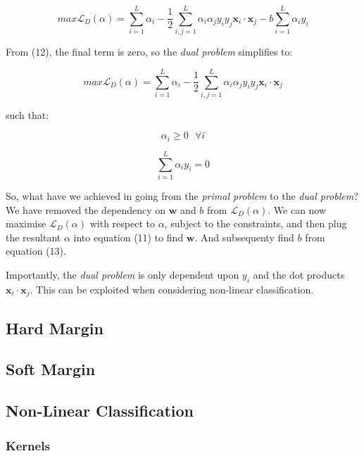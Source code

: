 \documentclass[10pt, a4paper,reqno]{amsart}
\begin{document}
\begin{equation}
max\mathcal{L}_D(\alpha) = \sum_{i=1}^{L}\alpha_i - \frac{1}{2}\sum_{i,j=1}^{L}\alpha_i \alpha_j y_i y_j\mathbf{x}_i\cdot\mathbf{x}_j - b\sum_{i=1}^{L}\alpha_i y_i
\end{equation}

From (12), the final term is zero, so the \emph{dual problem} simplifies to:

\begin{equation}
max\mathcal{L}_D(\alpha) = \sum_{i=1}^{L}\alpha_i - \frac{1}{2}\sum_{i,j=1}^{L}\alpha_i \alpha_j y_i y_j\mathbf{x}_i\cdot\mathbf{x}_j
\end{equation}

such that:

\begin{equation}
\alpha_i\geq0\text{ }\forall{i}
\end{equation}

\begin{equation}
\sum_{i=1}^{L}\alpha_i y_i = 0
\end{equation}

So, what have we achieved in going from the \emph{primal problem} to the \emph{dual problem}? We have removed the dependency on $\mathbf{w}$ and $b$ from $\mathcal{L}_D(\alpha)$. We can now maximise $\mathcal{L}_D(\alpha)$ with respect to $\alpha$, subject to the constraints, and then plug the resultant $\alpha$ into equation (11) to find $\mathbf{w}$. And subsequenty find $b$ from equation (13).

Importantly, the \emph{dual problem} is only dependent upon $y_i$ and the dot products $\mathbf{x}_i\cdot\mathbf{x}_j$. This can be exploited when considering non-linear classification.


\subsection{Hard Margin}


\subsection{Soft Margin}


\subsection{Non-Linear Classification}


\subsubsection{Kernels}
\end{document}
